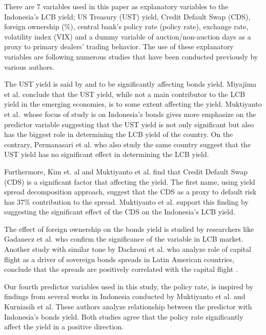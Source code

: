 \documentclass[11pt,a4paper,]{article}
\begin{document}
There are 7 variables used in this paper as explanatory variables to the Indonesia's LCB yield; US Treasury (UST) yield, Credit Default Swap (CDS), foreign ownership (\%), central bank's policy rate (policy rate), exchange rate, volatility index (VIX) and a dummy variable of auction/non-auction days as a proxy to primary dealers' trading behavior. The use of these explanatory variables are following numerous studies that have been conducted previously by various authors.

The UST yield is said by \autocite{Miyajima2015} and \autocite{Muktiyanto2019} to be significantly affecting bonds yield. Miyajima et al. \autocite*{Miyajima2015} conclude that the UST yield, while not a main contributor to the LCB yield in the emerging economies, is to some extent affecting the yield. Muktiyanto et al.~whose focus of study is on Indonesia's bonds gives more emphasize on the predictor variable suggesting that the UST yield is not only significant but also has the biggest role in determining the LCB yield of the country. On the contrary, Permanasari et al. \autocite*{Permanasari2021} who also study the same country suggest that the UST yield has no significant effect in determining the LCB yield.

Furthermore, Kim et. al \autocite*{Kim2014} and Muktiyanto et al. \autocite*{Muktiyanto2019} find that Credit Default Swap (CDS) is a significant factor that affecting the yield. The first name, using yield spread decomposition approach, suggest that the CDS as a proxy to default risk has 37\% contribution to the spread. Muktiyanto et al. \autocite{Muktiyanto2019} support this finding by suggesting the significant effect of the CDS on the Indonesia's LCB yield.

The effect of foreign ownership on the bonds yield is studied by researchers like Gadanecz et al. \autocite*{Gadanecz2018} who confirm the significance of the variable in LCB market. Another study with similar tone by Dachroui et al. \autocite{Dachraoui2020} who analyze role of capital flight as a driver of sovereign bonds spreads in Latin American countries, conclude that the spreads are positively correlated with the capital flight \autocite*{Dachraoui2020}.

Our fourth predictor variables used in this study, the policy rate, is inspired by findings from several works in Indonesia conducted by Muktiyanto et al. \autocite*{Muktiyanto2019} and Kurniasih et al. \autocite*{Kurniasih2015} These authors analyze relationship between the predictor with Indonesia's bonds yield. Both studies agree that the policy rate significantly affect the yield in a positive direction.
\end{document}
